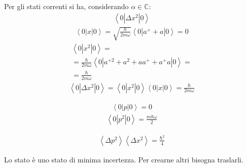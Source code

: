 Per gli stati correnti si ha, considerando $\alpha\in\mathbb{C} $:
\begin{equation}\begin{split}
\left\langle 0|\Delta x^2|0 \right\rangle
\end{split}\end{equation}
\begin{equation}\begin{split}
\left\langle 0|x|0 \right\rangle=\sqrt{\frac{\hbar }{2m\omega }}\left\langle 0|a^++a|0 \right\rangle=0
\end{split}\end{equation}
\begin{equation}\begin{split}
\left\langle 0|x^2|0 \right\rangle=\\
=\frac{\hbar }{2m\omega }\left\langle 0|a^{+2}+a^2+aa^++a^+a|0 \right\rangle=\\
=\frac{\hbar }{2m\omega }
\end{split}\end{equation}
\begin{equation}\begin{split}
\left\langle 0|\Delta x^2|0 \right\rangle=\left\langle 0|x^2|0 \right\rangle\left\langle 0|x|0 \right\rangle=\frac{\hbar }{2m\omega }
\end{split}\end{equation}

\begin{equation}\begin{split}
\left\langle 0|p|0 \right\rangle=0
\end{split}\end{equation}
\begin{equation}\begin{split}
\left\langle 0|p^2|0 \right\rangle=\frac{m\hbar \omega }{2}
\end{split}\end{equation}

\begin{equation}\begin{split}
\left\langle \Delta p^2 \right\rangle\left\langle \Delta x^2 \right\rangle=\frac{\hbar ^2}{4}
\end{split}\end{equation}

Lo stato è uno stato di minima incertezza. Per crearne altri bisogna traslarli.

